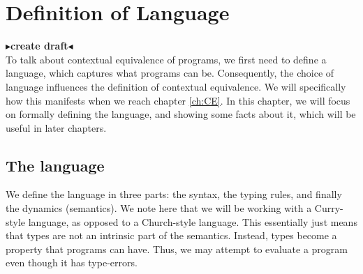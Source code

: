 \documentclass[twoside,11pt,openright]{report}
\theoremstyle{definition}
\newcommand{\todo}[1]{{\color[rgb]{.5,0,0}\textbf{$\blacktriangleright$#1$\blacktriangleleft$}}}
\begin{document}
\chapter{Definition of Language}
\label{ch:DoL}
\todo{create draft}\\
To talk about contextual equivalence of programs, we first need to define a language, which captures what programs can be. Consequently, the choice of language influences the definition of contextual equivalence. We will specifically how this manifests when we reach chapter \ref{ch:CE}. In this chapter, we will focus on formally defining the language, and showing some facts about it, which will be useful in later chapters.
\section{The language}
We define the language in three parts: the syntax, the typing rules, and finally the dynamics (semantics). We note here that we will be working with a Curry-style language, as opposed to a Church-style language. This essentially just means that types are not an intrinsic part of the semantics. Instead, types become a property that programs can have. Thus, we may attempt to evaluate a program even though it has type-errors.
\end{document}
